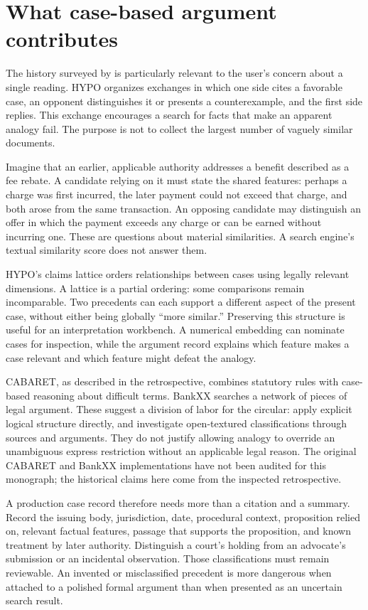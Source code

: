\documentclass[12pt,a4paper,oneside,openany]{book}
\begin{document}
\section{What case-based argument contributes}

The history surveyed by \citet[sections 2--3]{hypolegacy2017} is particularly
relevant to the user's concern about a single reading. HYPO organizes exchanges
in which one side cites a favorable case, an opponent distinguishes it or presents
a counterexample, and the first side replies. This exchange encourages a search
for facts that make an apparent analogy fail. The purpose is not to collect the
largest number of vaguely similar documents.

Imagine that an earlier, applicable authority addresses a benefit described as a
fee rebate. A candidate relying on it must state the shared features: perhaps a
charge was first incurred, the later payment could not exceed that charge, and
both arose from the same transaction. An opposing candidate may distinguish an
offer in which the payment exceeds any charge or can be earned without incurring
one. These are questions about material similarities. A search engine's textual
similarity score does not answer them.

HYPO's claims lattice orders relationships between cases using legally relevant
dimensions. A lattice is a partial ordering: some comparisons remain
incomparable. Two precedents can each support a different aspect of the present
case, without either being globally ``more similar.'' Preserving this structure
is useful for an interpretation workbench. A numerical embedding can nominate
cases for inspection, while the argument record explains which feature makes a
case relevant and which feature might defeat the analogy.

CABARET, as described in the retrospective, combines statutory rules with
case-based reasoning about difficult terms. BankXX searches a network of pieces
of legal argument. These suggest a division of labor for the circular: apply
explicit logical structure directly, and investigate open-textured classifications
through sources and arguments. They do not justify allowing analogy to override
an unambiguous express restriction without an applicable legal reason. The
original CABARET and BankXX implementations have not been audited for this
monograph; the historical claims here come from the inspected retrospective.

A production case record therefore needs more than a citation and a summary.
Record the issuing body, jurisdiction, date, procedural context, proposition
relied on, relevant factual features, passage that supports the proposition, and
known treatment by later authority. Distinguish a court's holding from an
advocate's submission or an incidental observation. Those classifications must
remain reviewable. An invented or misclassified precedent is more dangerous when
attached to a polished formal argument than when presented as an uncertain search
result.
\end{document}
